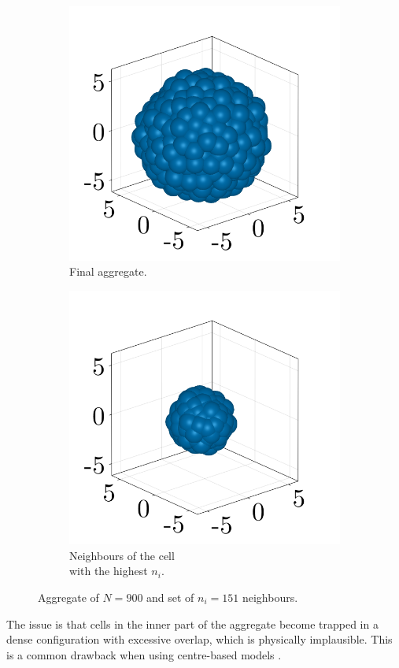 \begin{figure}[ht]
    \centering
    \begin{subfigure}{0.45\textwidth}
        \centering
        \includegraphics[width=0.65\linewidth]{figures/302/302-aggregate-nbs-full.png}
        \caption{Final aggregate. \\ \hfill}
    \end{subfigure}
    \begin{subfigure}{0.45\textwidth}
        \centering
        \includegraphics[width=0.65\linewidth]{figures/302/302-aggregate-nbs.png}
        \caption{Neighbours of the cell \\ with the highest $n_i$.}
    \end{subfigure}
    
    \caption{Aggregate of $N=900$ and set of $n_i=151$ neighbours.}
    \label{fig:aggregate_nbs}
\end{figure}

\newpage
The issue is that cells in the inner part of the aggregate become trapped in a dense configuration with excessive overlap, which is physically implausible. This is a common drawback when using centre-based models \parencite{Liedekerke_2015}. 



